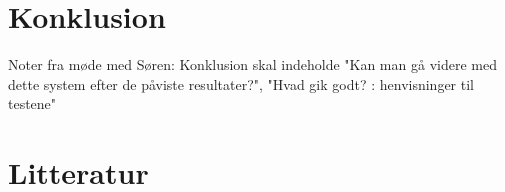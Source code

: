 \documentclass[11pt,a4paper,draft]{article}
\begin{document}
\section{Konklusion}

Noter fra møde med Søren: Konklusion skal indeholde "Kan man gå videre med dette system efter de påviste resultater?", "Hvad gik godt? : henvisninger til testene"


\newpage %
%
\section{Litteratur}
\end{document}
